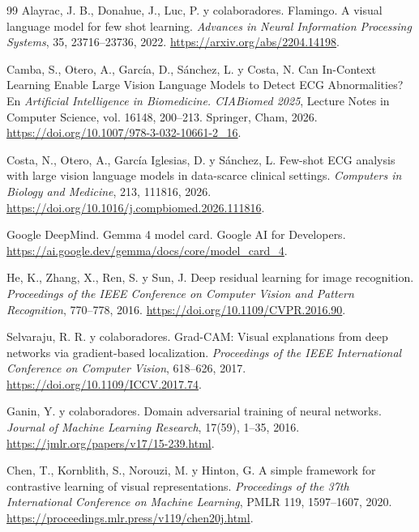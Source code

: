 \begin{thebibliography}{99}
Alayrac, J. B., Donahue, J., Luc, P. y colaboradores.
\newblock Flamingo. A visual language model for few shot learning.
\newblock \emph{Advances in Neural Information Processing Systems}, 35, 23716--23736, 2022.
\newblock \url{https://arxiv.org/abs/2204.14198}.

Camba, S., Otero, A., García, D., Sánchez, L. y Costa, N.
\newblock Can In-Context Learning Enable Large Vision Language Models to Detect ECG Abnormalities?
\newblock En \emph{Artificial Intelligence in Biomedicine. CIABiomed 2025}, Lecture Notes in Computer Science, vol. 16148, 200--213. Springer, Cham, 2026.
\newblock \url{https://doi.org/10.1007/978-3-032-10661-2_16}.

Costa, N., Otero, A., García Iglesias, D. y Sánchez, L.
\newblock Few-shot ECG analysis with large vision language models in data-scarce clinical settings.
\newblock \emph{Computers in Biology and Medicine}, 213, 111816, 2026.
\newblock \url{https://doi.org/10.1016/j.compbiomed.2026.111816}.

Google DeepMind.
\newblock Gemma 4 model card.
\newblock Google AI for Developers.
\newblock \url{https://ai.google.dev/gemma/docs/core/model_card_4}.

He, K., Zhang, X., Ren, S. y Sun, J.
\newblock Deep residual learning for image recognition.
\newblock \emph{Proceedings of the IEEE Conference on Computer Vision and Pattern Recognition}, 770--778, 2016.
\newblock \url{https://doi.org/10.1109/CVPR.2016.90}.

Selvaraju, R. R. y colaboradores.
\newblock Grad-CAM: Visual explanations from deep networks via gradient-based localization.
\newblock \emph{Proceedings of the IEEE International Conference on Computer Vision}, 618--626, 2017.
\newblock \url{https://doi.org/10.1109/ICCV.2017.74}.

Ganin, Y. y colaboradores.
\newblock Domain adversarial training of neural networks.
\newblock \emph{Journal of Machine Learning Research}, 17(59), 1--35, 2016.
\newblock \url{https://jmlr.org/papers/v17/15-239.html}.

Chen, T., Kornblith, S., Norouzi, M. y Hinton, G.
\newblock A simple framework for contrastive learning of visual representations.
\newblock \emph{Proceedings of the 37th International Conference on Machine Learning}, PMLR 119, 1597--1607, 2020.
\newblock \url{https://proceedings.mlr.press/v119/chen20j.html}.


\end{thebibliography}
